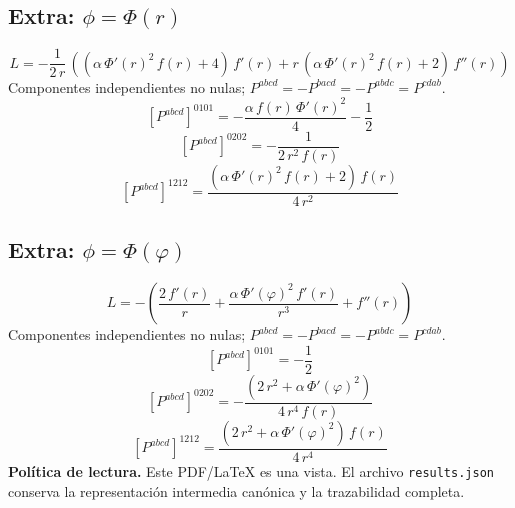 \documentclass[11pt]{article}
\begin{document}
\subsection*{Extra: $\phi=\Phi\!\left(r\right)$}
\begin{dmath*}[breakdepth={5}]
L=-\frac{1}{2\,r}\,\left(\left(\alpha\,{\Phi'\!\left(r\right)}^{2}\,f\!\left(r\right) + 4\right)\,f'\!\left(r\right) + r\,\left(\alpha\,{\Phi'\!\left(r\right)}^{2}\,f\!\left(r\right) + 2\right)\,f''\!\left(r\right)\right)
\end{dmath*}
Componentes independientes no nulas; $P^{abcd}=-P^{bacd}=-P^{abdc}=P^{cdab}$.
\begin{dmath*}[breakdepth={5}]
\left[P^{abcd}\right]^{0101}=-\frac{\alpha\,f\!\left(r\right)\,{\Phi'\!\left(r\right)}^{2}}{4} - \frac{1}{2}
\end{dmath*}
\begin{dmath*}[breakdepth={5}]
\left[P^{abcd}\right]^{0202}=-\frac{1}{2\,{r}^{2}\,f\!\left(r\right)}
\end{dmath*}
\begin{dmath*}[breakdepth={5}]
\left[P^{abcd}\right]^{1212}=\frac{\left(\alpha\,{\Phi'\!\left(r\right)}^{2}\,f\!\left(r\right) + 2\right)\,f\!\left(r\right)}{4\,{r}^{2}}
\end{dmath*}
\subsection*{Extra: $\phi=\Phi\!\left(\varphi\right)$}
\begin{dmath*}[breakdepth={5}]
L=-\left(\frac{2\,f'\!\left(r\right)}{r} + \frac{\alpha\,{\Phi'\!\left(\varphi\right)}^{2}\,f'\!\left(r\right)}{{r}^{3}} + f''\!\left(r\right)\right)
\end{dmath*}
Componentes independientes no nulas; $P^{abcd}=-P^{bacd}=-P^{abdc}=P^{cdab}$.
\begin{dmath*}[breakdepth={5}]
\left[P^{abcd}\right]^{0101}=-\frac{1}{2}
\end{dmath*}
\begin{dmath*}[breakdepth={5}]
\left[P^{abcd}\right]^{0202}=-\frac{\left(2\,{r}^{2} + \alpha\,{\Phi'\!\left(\varphi\right)}^{2}\right)}{4\,{r}^{4}\,f\!\left(r\right)}
\end{dmath*}
\begin{dmath*}[breakdepth={5}]
\left[P^{abcd}\right]^{1212}=\frac{\left(2\,{r}^{2} + \alpha\,{\Phi'\!\left(\varphi\right)}^{2}\right)\,f\!\left(r\right)}{4\,{r}^{4}}
\end{dmath*}
\bigskip\noindent\textbf{Política de lectura.} Este PDF/LaTeX es una vista. El archivo \texttt{results.json} conserva la representación intermedia canónica y la trazabilidad completa.
\end{document}

